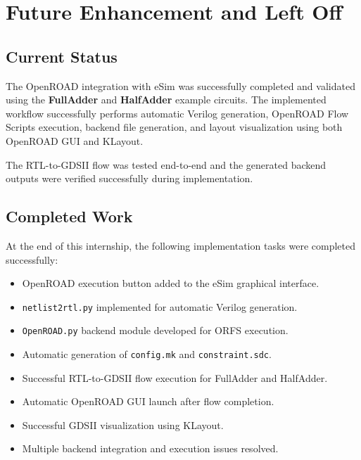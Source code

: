 \chapter{Future Enhancement and Left Off}

\section{Current Status}

The OpenROAD integration with eSim was successfully completed and validated using the \textbf{FullAdder} and \textbf{HalfAdder} example circuits. The implemented workflow successfully performs automatic Verilog generation, OpenROAD Flow Scripts execution, backend file generation, and layout visualization using both OpenROAD GUI and KLayout.

The RTL-to-GDSII flow was tested end-to-end and the generated backend outputs were verified successfully during implementation.

\section{Completed Work}

At the end of this internship, the following implementation tasks were completed successfully:

\begin{itemize}
    \item OpenROAD execution button added to the eSim graphical interface.
    
    \item \texttt{netlist2rtl.py} implemented for automatic Verilog generation.
    
    \item \texttt{OpenROAD.py} backend module developed for ORFS execution.
    
    \item Automatic generation of \texttt{config.mk} and \texttt{constraint.sdc}.
    
    \item Successful RTL-to-GDSII flow execution for FullAdder and HalfAdder.
    
    \item Automatic OpenROAD GUI launch after flow completion.
    
    \item Successful GDSII visualization using KLayout.
    
    \item Multiple backend integration and execution issues resolved.
\end{itemize}

